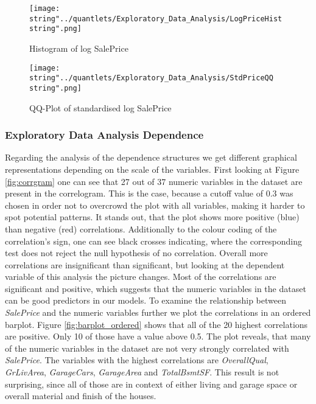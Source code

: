 \begin{figure}[H]
  \centering
\texttt{[image: \\string"../quantlets/Exploratory\_Data\_Analysis/LogPriceHist\\string".png]}
  \caption{Histogram of log SalePrice}\label{fig:logpricehist}
\end{figure}

\begin{figure}[H]
  \centering
\texttt{[image: \\string"../quantlets/Exploratory\_Data\_Analysis/StdPriceQQ\\string".png]}
  \caption{QQ-Plot of standardised log SalePrice}\label{fig:stdpriceqq}
\end{figure}




\subsubsection{Exploratory Data Analysis Dependence}
Regarding the analysis of the dependence structures we get different graphical representations depending on the scale of the variables. First looking at Figure \ref{fig:corrgram} one can see that 27 out of 37 numeric variables in the dataset are present in the correlogram. This is the case, because a cutoff value of 0.3 was chosen in order not to overcrowd the plot with all variables, making it harder to spot potential patterns. It stands out, that the plot shows more positive (blue) than negative (red) correlations. Additionally to the colour coding of the correlation's sign, one can see black crosses indicating, where the corresponding test does not reject the null hypothesis of no correlation. Overall more correlations are insignificant than significant, but looking at the dependent variable of this analysis the picture changes. Most of the correlations are significant and positive, which suggests that the numeric variables in the dataset can be good predictors in our models. To examine the relationship between \textit{SalePrice} and the numeric variables further we plot the correlations in an ordered barplot. Figure \ref{fig:barplot_ordered} shows that all of the 20 highest correlations are positive. Only 10 of those have a value above 0.5. The plot reveals, that many of the numeric variables in the dataset are not very strongly correlated with \textit{SalePrice}. The variables with the highest correlations are \textit{OverallQual}, \textit{GrLivArea}, \textit{GarageCars}, \textit{GarageArea} and \textit{TotalBsmtSF}. This result is not surprising, since all of those are in context of either living and garage space or overall material and finish of the houses.

